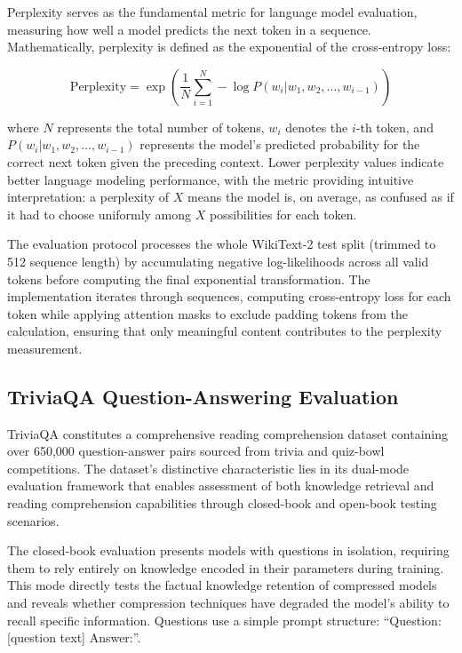 Perplexity serves as the fundamental metric for language model evaluation, measuring how well a model predicts the next token in a sequence. Mathematically, perplexity is defined as the exponential of the cross-entropy loss:

\begin{equation}
\text{Perplexity} = \exp\left(\frac{1}{N} \sum_{i=1}^{N} -\log P(w_i | w_1, w_2, \ldots, w_{i-1})\right)
\end{equation}

where $N$ represents the total number of tokens, $w_i$ denotes the $i$-th token, and $P(w_i | w_1, w_2, \ldots, w_{i-1})$ represents the model's predicted probability for the correct next token given the preceding context.
Lower perplexity values indicate better language modeling performance, with the metric providing intuitive interpretation: a perplexity of $X$ means the model is, on average, as confused as if it had to choose uniformly among $X$ possibilities for each token.

The evaluation protocol processes the whole WikiText-2 test split (trimmed to 512 sequence length) by accumulating negative log-likelihoods across all valid tokens before computing the final exponential transformation. The implementation iterates through sequences, computing cross-entropy loss for each token while applying attention masks to exclude padding tokens from the calculation, ensuring that only meaningful content contributes to the perplexity measurement.

\subsection{TriviaQA Question-Answering Evaluation}

TriviaQA \cite{triviaqa} constitutes a comprehensive reading comprehension dataset containing over 650,000 question-answer pairs sourced from trivia and quiz-bowl competitions. The dataset's distinctive characteristic lies in its dual-mode evaluation framework that enables assessment of both knowledge retrieval and reading comprehension capabilities through closed-book and open-book testing scenarios.

The closed-book evaluation presents models with questions in isolation, requiring them to rely entirely on knowledge encoded in their parameters during training. This mode directly tests the factual knowledge retention of compressed models and reveals whether compression techniques have degraded the model's ability to recall specific information. Questions use a simple prompt structure: ``Question: [question text] Answer:''.


